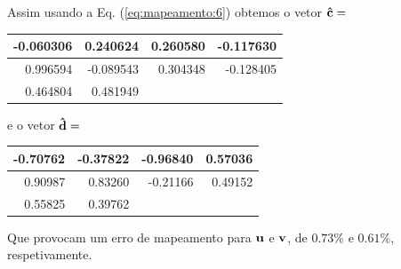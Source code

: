 \begin{example}[ Mapeamento do polinomio 
$\VECTOR{f}(x,y)$ de grau $M=3$, para $N=15$ amostras:]
\begin{minipage}{0.61\textwidth}
Assim usando a Eq. (\ref{eq:mapeamento:6}) obtemos o vetor $\VECTOR{\hat{c}}=$ 
\begin{center}
\begin{tabular}{ r r r r }
  \hline
  -0.060306 &   0.240624 &   0.260580 &  -0.117630 \\ \hline
   0.996594 &  -0.089543 &   0.304348 &  -0.128405 \\ \hline
   0.464804 &   0.481949 & ~ & ~ \\ \hline
\end{tabular}
\end{center}

e o vetor $\VECTOR{\hat{d}}=$ 
\begin{center}
\begin{tabular}{ r r r r }
\hline
  -0.70762 &  -0.37822 &  -0.96840 &   0.57036 \\ \hline
   0.90987 &   0.83260 &  -0.21166 &   0.49152  \\ \hline
   0.55825 &   0.39762 & ~ & ~ \\ \hline
\end{tabular}
\end{center}
Que provocam um erro de mapeamento para $\VECTOR{u}$ e $\VECTOR{v}$,
de $0.73\%$ e $0.61\%$, respetivamente.
\end{minipage}
\end{example}


